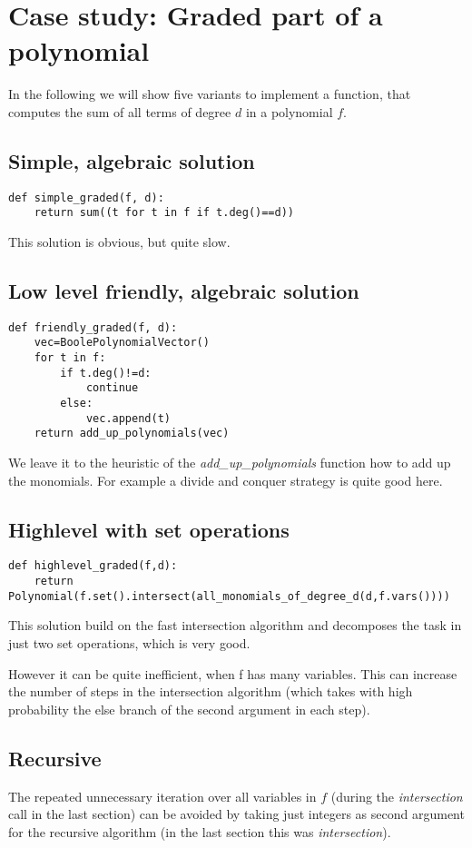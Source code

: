 \documentclass[]{article}
\newcommand{\functionname}[1]{\textit{#1}\xspace}
\newcounter{thm}
\begin{document}
\section{Case study: Graded part of a polynomial}
In the following we will show five variants to implement a function, that computes the sum of all terms of degree $d$ in a polynomial $f$.

\subsection{Simple, algebraic solution}
\begin{verbatim}
def simple_graded(f, d):
    return sum((t for t in f if t.deg()==d))   
\end{verbatim}
This solution is obvious, but quite slow.

\subsection{Low level friendly, algebraic solution}
\begin{verbatim}
def friendly_graded(f, d):
    vec=BoolePolynomialVector()
    for t in f:
        if t.deg()!=d:
            continue
        else:
            vec.append(t)
    return add_up_polynomials(vec)
\end{verbatim}
We leave it to the heuristic of the \functionname{add\_up\_polynomials} function how to add up the monomials. For example a divide and conquer strategy is quite good here.

\subsection{Highlevel with set operations}
\begin{verbatim}
def highlevel_graded(f,d):
    return Polynomial(f.set().intersect(all_monomials_of_degree_d(d,f.vars())))
\end{verbatim}
This solution build on the fast intersection algorithm and decomposes the task in just two set operations, which is very good.

However it can be quite inefficient, when f has many variables.
This can increase the number of steps in the intersection algorithm (which takes with high probability the else branch of the second argument in each step).

\subsection{Recursive}
The repeated unnecessary iteration over all variables in $f$ (during the \functionname{intersection} call in the last section) can be avoided by taking just integers as second argument for the recursive algorithm (in the last section this was \functionname{intersection}).
\end{document}
